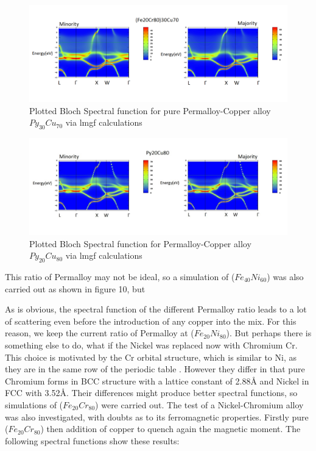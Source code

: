 \documentclass[12pt]{article}
\begin{document}
\begin{figure}[htp]
    \centering
    \begin{measuredfigure}
    \includegraphics[scale=0.40]{specfunc/cu70}
    \caption{Plotted Bloch Spectral function for pure Permalloy-Copper alloy $Py_{30}Cu_{70}$ via lmgf calculations}
    \end{measuredfigure}
    \end{figure}
\begin{figure}[htp]
    \centering
    \begin{measuredfigure}
    \includegraphics[scale=0.40]{specfunc/cu80}
    \caption{Plotted Bloch Spectral function for Permalloy-Copper alloy $Py_{20}Cu_{80}$ via lmgf calculations}
    \end{measuredfigure}
    \end{figure}
\clearpage
This ratio of Permalloy may not be ideal, so a simulation of ($Fe_{40}Ni_{60}$) was also carried out as shown in figure 10, but 



As is obvious, the spectral function of the different Permalloy ratio leads to a lot of scattering even before the introduction of any copper into the mix. For this reason, we keep the current ratio of Permalloy at ($Fe_{20}Ni_{80}$). But perhaps there is something else to do, what if the Nickel was replaced now with Chromium Cr. This choice is motivated by the Cr orbital structure, which is similar to Ni, as they are in the same row of the periodic table \cite{ashcroft}. However they differ in that pure Chromium forms in BCC structure with a lattice constant of 2.88{\AA} and Nickel in FCC with 3.52{\AA}. Their differences might produce better spectral functions, so simulations of ($Fe_{20}Cr_{80}$) were carried out. The test of a Nickel-Chromium alloy was also investigated, with doubts as to its ferromagnetic properties. Firstly pure ($Fe_{20}Cr_{80}$) then addition of copper to quench again the magnetic moment. The following spectral functions show these results:
\end{document}
